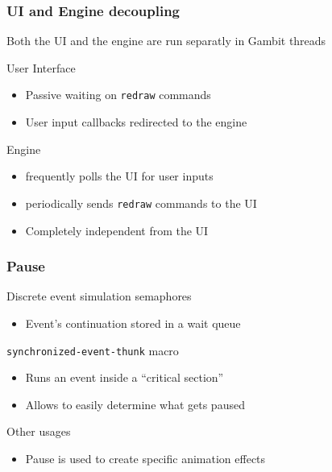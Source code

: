 \documentclass{beamer}
\newcommand{\<}[1]{\`#1}
\begin{document}
\begin{frame}
  \frametitle{UI and Engine decoupling}

  Both the UI and the engine are run separatly in Gambit threads
  \begin{block}{User Interface}
    \begin{itemize}
    \item Passive waiting on \texttt{redraw} commands
    \item User input callbacks redirected to the engine
    \end{itemize}
  \end{block}

  \begin{block}{Engine}
    \begin{itemize}
    \item frequently polls the UI for user inputs
    \item periodically sends \texttt{redraw} commands to the UI
    \item Completely independent from the UI
    \end{itemize}
  \end{block}
\end{frame}

\begin{frame}
  \frametitle{Pause}

  \begin{block}{Discrete event simulation semaphores }
    \begin{itemize}
      \item Event's continuation stored in a wait queue
    \end{itemize}
  \end{block}

  \begin{block}{\texttt{synchronized-event-thunk} macro}
    \begin{itemize}
      \item Runs an event inside a ``critical section''
      \item Allows to easily determine what gets paused
    \end{itemize}
  \end{block}

  \begin{block}{Other usages}
    \begin{itemize}
      \item Pause is used to create specific animation effects
    \end{itemize}
  \end{block}
\end{frame}
\end{document}
